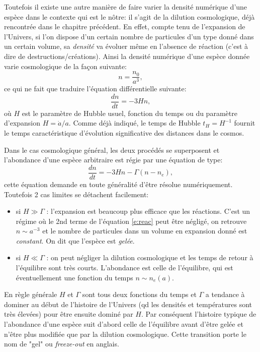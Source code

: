 Toutefois il existe une autre manière de faire varier la densité numérique d'une espèce dans le contexte qui est le nôtre: il s'agit de la dilution cosmologique, déjà rencontrée dans le chapitre précédent. En effet, compte tenu de l'expansion de l'Univers, si l'on dispose d'un certain nombre de particules d'un type donné dans un certain volume, sa \textit{densité} va évoluer même en l'absence de réaction (c'est à dire de destructions/créations). Ainsi la densité numérique d'une espèce donnée varie cosmologique de la façon suivante:
\begin{equation}
n=\frac{n_0}{a^3},
\end{equation}
ce qui ne fait que traduire l'équation différentielle suivante:
\begin{equation}
\frac{dn}{dt}=-3Hn,
\end{equation}
où $H$ est le paramètre de Hubble usuel, fonction du temps ou du paramètre d'expansion $H=\dot a/a$. Comme déjà indiqué, le temps de Hubble $t_H=H^{-1}$ fournit le temps caractéristique d'évolution significative des distances dans le cosmos.

Dans le cas cosmologique général, les deux procédés se superposent et l'abondance d'une espèce arbitraire est régie par une équation de type:
\begin{equation}
\frac{dn}{dt}=-3Hn-\Gamma (n-n_e),
\label{e:reac}
\end{equation}
cette équation demande en toute généralité d'être résolue numériquement. Toutefois 2 cas limites se détachent facilement:
\begin{itemize}
\item si $H\gg \Gamma$ : l'expansion est beaucoup plus efficace que les réactions. C'est un régime où le 2nd terme de l'équation \ref{e:reac} peut être négligé, on retrouve $n\sim a^{-3}$ et le nombre de particules dans un volume en expansion donné est \textit{constant}. On dit que l'espèce est \textit{gelée}.
\item si $H\ll \Gamma$ : on peut négliger la dilution cosmologique et les temps de retour à l'équilibre sont très courts. L'abondance est celle de l'équilibre, qui est éventuellement une fonction du temps $n\sim n_e(a)$.
\end{itemize}

En règle générale $H$ et $\Gamma$ sont tous deux fonctions du temps et $\Gamma$ a tendance à dominer au début de l'histoire de l'Univers (qd les densités et températures sont très élevées) pour être ensuite dominé par $H$. Par conséquent l'histoire typique de l'abondance d'une espèce suit d'abord celle de l'équilibre avant d'être gelée et n'être plus modifiée que par la dilution cosmologique. Cette transition porte le nom de "gel" ou \textit{freeze-out} en anglais.



